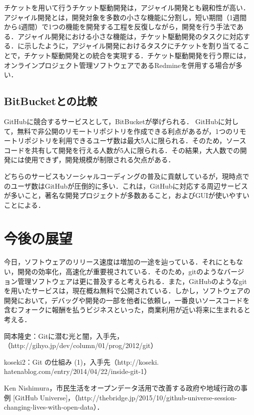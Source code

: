 \documentclass[a4j,9pt,twocolumn]{jsarticle}
\begin{document}
チケットを用いて行うチケット駆動開発は，アジャイル開発とも親和性が高い．アジャイル開発とは，開発対象を多数の小さな機能に分割し，短い期間（1週間から4週間）で1つの機能を開発する工程を反復しながら，開発を行う手法である．アジャイル開発における小さな機能は，チケット駆動開発のタスクに対応する．に示したように，アジャイル開発におけるタスクにチケットを割り当てることで，チケット駆動開発との統合を実現する．チケット駆動開発を行う際には，オンラインプロジェクト管理ソフトウェアであるRedmineを併用する場合が多い．

\subsection{BitBucketとの比較}
GitHubに競合するサービスとして，BitBucketが挙げられる． GitHubに対して，無料で非公開のリモートリポジトリを作成できる利点があるが，1つのリモートリポジトリを利用できるユーザ数は最大5人に限られる．そのため，ソースコードを共有して開発を行える人数が5人に限られる．その結果，大人数での開発には使用できず，開発規模が制限される欠点がある．

どちらのサービスもソーシャルコーディングの普及に貢献しているが，現時点でのユーザ数はGitHubが圧倒的に多い．これは，GitHubに対応する周辺サービスが多いこと，著名な開発プロジェクトが多数あること，およびGUIが使いやすいことによる．

\section{今後の展望}
今日，ソフトウェアのリリース速度は増加の一途を辿っている．それにともない，開発の効率化，高速化が重要視されている．そのため，gitのようなバージョン管理ソフトウェアは更に普及すると考えられる．また，GitHubのようなgitを用いたサービスは，現在概ね無料で公開されている．しかし，ソフトウェアの開発において，デバッグや開発の一部を他者に依頼し，一番良いソースコードを含むフォークに報酬を払うビジネスといった，商業利用が近い将来に生まれると考える．

\small
\begin{thebibliography}{99}
岡本隆史：Gitに潜む光と闇，入手先，（http://gihyo.jp/dev/column/01/prog/2012/git）

koseki2：Git の仕組み (1)，入手先（http://koseki.\\hatenablog.com/entry/2014/04/22/inside-git-1）

Ken Nishimura，市民生活をオープンデータ活用で改善する政府や地域行政の事例 [GitHub Universe]，（http://thebridge.jp/2015/10/github-universe-session-changing-lives-with-open-data）．
\end{thebibliography}
\end{document}
